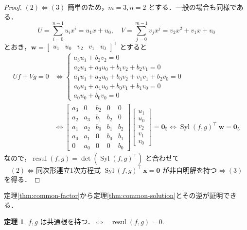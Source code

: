 \documentclass[12pt, uplatex, dvipdfmx]{jsarticle}
\theoremstyle{definition}
\newtheorem{theorem}{定理}
\DeclareMathOperator{\Syl}{Syl}
\DeclareMathOperator{\resul}{resul}
\begin{document}
\begin{proof}
  $(2) \Leftrightarrow (3)$ 簡単のため，$m=3, n=2$
  とする．一般の場合も同様である．
  \[
    U= \sum_{i=0}^{n-1} u_i x^i=u_1 x + u_0, \quad V= \sum_{j=0}^{m-1} v_j x^j=v_2 x^2+v_1 x + v_0
  \]
  とおき，$\bm{w} = \left[
    \begin{array}{ccccc}
      u_1 & u_0 & v_2 & v_1 & v_0
    \end{array}
    \right]^{\top}$ とすると
  \[
    \begin{aligned}
      Uf+Vg=0 &\Leftrightarrow
      \begin{cases}
        a_3u_1 + b_2v_2=0\\
        a_2u_1+a_3u_0+b_1v_2+b_2v_1=0\\
        a_1u_1+a_2u_0+b_0v_2+v_1v_1+b_2v_0=0\\
        a_0u_1+a_1u_0+b_0v_1+b_1v_0=0\\
        a_0u_0+b_0v_0=0
      \end{cases}\\
      & \Leftrightarrow \left[
        \begin{array}{ccccc}
          a_3 & 0 & b_2 & 0 & 0\\
          a_2 & a_3 & b_1 & b_2 & 0\\
          a_1 & a_2 & b_0 & b_1 & b_2\\
          a_0 & a_1 & 0 & b_0 & b_1\\
          0 & a_0 & 0 & 0 & b_0
        \end{array}
      \right] \left[
        \begin{array}{c}
          u_1\\
          u_0\\
          v_2\\
          v_1\\
          v_0
        \end{array}
      \right] = \bm{0}_5
      \Leftrightarrow \Syl(f,g)^{\top} ~\bm{w}= \bm{0}_5
    \end{aligned}
  \]
  なので，$\resul(f,g) = \det\left(\Syl(f,g)^{\top}\right)$ と合わせて
  \[
    (2) \Leftrightarrow \text{同次形連立1次方程式 } \Syl(f,g)^{\top}~\bm{x}=\bm{0} \text{ が非自明解を持つ} \Leftrightarrow (3)
  \]
  を得る．
\end{proof}

定理\ref{thm:common-factor}から定理\ref{thm:common-solution}とその逆が証明できる．

\begin{theorem}\label{thm:solution-resul}
$f,g$ は共通根を持つ．$\Leftrightarrow$ \ $\resul(f,g) =0$. 
\end{theorem}
\end{document}
